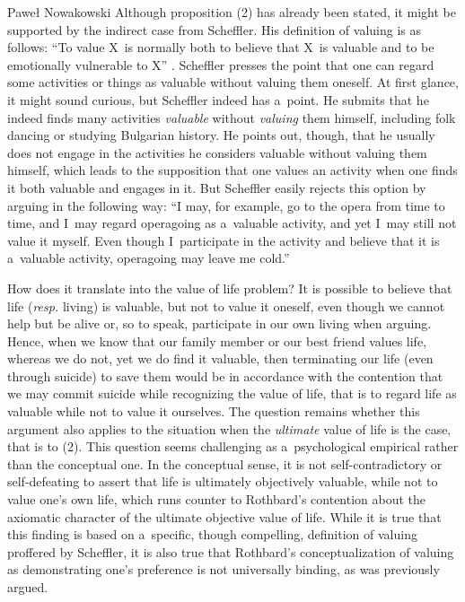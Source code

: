 \begin{artengenv}{Paweł Nowakowski}
Although proposition (2) has already been stated, it might be supported by the indirect case from Scheffler. His definition of valuing is as follows: ``To value X~is normally both to believe that X~is valuable and to be emotionally vulnerable to X'' 
\parencite[][p.31]{Scheffler2011Valuing}. %
 Scheffler 
\parencite*[][pp.26–27]{Scheffler2011Valuing} %
 presses the point that one can regard some activities or things as valuable without valuing them oneself. At first glance, it might sound curious, but Scheffler indeed has a~point. He submits that he indeed finds many activities \textit{valuable} without \textit{valuing} them himself, including folk dancing or studying Bulgarian history. He points out, though, that he usually does not engage in the activities he considers valuable without valuing them himself, which leads to the supposition that one values an activity when one finds it both valuable and engages in it. But Scheffler 
\parencite*[][p.27]{Scheffler2011Valuing} %
 easily rejects this option by arguing in the following way: ``I may, for example, go to the opera from time to time, and I~may regard operagoing as a~valuable activity, and yet I~may still not value it myself. Even though I~participate in the activity and believe that it is a~valuable activity, operagoing may leave me cold.''



How does it translate into the value of life problem? It is possible to believe that life (\textit{resp.} living) is valuable, but not to value it oneself, even though we cannot help but be alive or, so to speak, participate in our own living when arguing. Hence, when we know that our family member or our best friend values life, whereas we do not, yet we do find it valuable, then terminating our life (even through suicide) to save them would be in accordance with the contention that we may commit suicide while recognizing the value of life, that is to regard life as valuable while not to value it ourselves. The question remains whether this argument also applies to the situation when the \textit{ultimate} value of life is the case, that is to (2). This question seems challenging as a~psychological empirical rather than the conceptual one. In the conceptual sense, it is not self-contradictory or self-defeating to assert that life is ultimately objectively valuable, while not to value one's own life, which runs counter to Rothbard's contention about the axiomatic character of the ultimate objective value of life. While it is true that this finding is based on a~specific, though compelling, definition of valuing proffered by Scheffler, it is also true that Rothbard's conceptualization of valuing as demonstrating one's preference is not universally binding, as was previously argued.




\end{artengenv}
